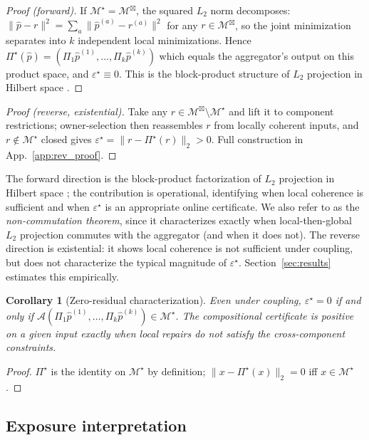 \documentclass{article}
\theoremstyle{plain}
\newtheorem{corollary}[theorem]{Corollary}
\theoremstyle{definition}
\theoremstyle{remark}
\newcommand{\Mprod}{\mathcal{M}^{\boxtimes}}
\newcommand{\Mjoint}{\mathcal{M}^{\star}}
\newcommand{\Pijoint}{\Pi^{\star}}
\newcommand{\Aagg}{\mathcal{A}}
\newcommand{\hpK}{\hat p}
\newcommand{\eps}{\varepsilon}
\begin{document}
\begin{proof}[Proof (forward)]
If $\Mjoint = \Mprod$, the squared $L_2$ norm decomposes:
$\|\hpK - r\|^2 = \sum_a \|\hpK^{(a)} - r^{(a)}\|^2$ for any
$r \in \Mprod$, so the joint minimization separates into $k$
independent local minimizations. Hence
$\Pijoint(\hpK) = (\Pi_1\hpK^{(1)},\dots,\Pi_k\hpK^{(k)})$ which
equals the aggregator's output on this product space, and
$\eps^\star \equiv 0$. This is the block-product structure of
$L_2$ projection in Hilbert space
\citep[Prop.~29.3]{bauschke2017convex}.
\end{proof}

\begin{proof}[Proof (reverse, existential)]
Take any $r\in\Mprod\setminus\Mjoint$ and lift it to component
restrictions; owner-selection then reassembles $r$ from locally
coherent inputs, and $r\notin\Mjoint$ closed gives
$\eps^\star\!=\!\|r-\Pijoint(r)\|_2\!>\!0$. Full construction in
App.~\ref{app:rev_proof}.
\end{proof}

The forward direction is the block-product factorization of
$L_2$ projection in Hilbert space
\citep[Prop.~29.3]{bauschke2017convex}; the contribution is
operational, identifying when local coherence is sufficient and
when $\eps^\star$ is an appropriate online certificate. We also
refer to  as the \emph{non-commutation theorem},
since it characterizes exactly when local-then-global $L_2$
projection commutes with the aggregator (and when it does not).
The reverse direction is existential: it shows local coherence is
not sufficient under coupling, but does not characterize the
typical magnitude of $\eps^\star$. Section~\ref{sec:results}
estimates this empirically.

\begin{corollary}[Zero-residual characterization]
\label{cor:zero}
Even under coupling, $\eps^\star = 0$ if and only if
$\Aagg(\Pi_1\hpK^{(1)},\dots,\Pi_k\hpK^{(k)}) \in \Mjoint$. The
compositional certificate is positive on a given input exactly
when local repairs do not satisfy the cross-component constraints.
\end{corollary}

\begin{proof}
$\Pijoint$ is the identity on $\Mjoint$ by definition;
$\|x - \Pijoint(x)\|_2 = 0$ iff $x \in \Mjoint$.
\end{proof}

\subsection{Exposure interpretation}
\label{subsec:syslmsr}
\end{document}
